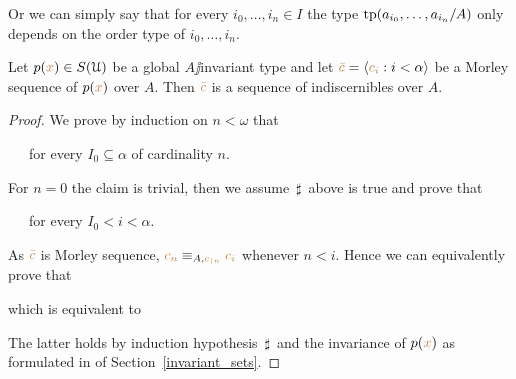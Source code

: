\documentclass[creche.tex]{subfiles}
\begin{document}

Or we can simply say that for every $i_0,\dots,i_n\in I$ the type ${\rm tp}(a_{i_0},\dots,a_{i_n}/A)$ only depends on the order type of $i_0,\dots,i_n$.

\begin{proposition}
Let $p({\color{brown} x})\in S(\EuScript U)$ be a global $A\jj$invariant type and let ${\color{brown}\bar c}=\langle{\color{brown}c_i}:i<\alpha\rangle$ be a Morley sequence of $p({\color{brown} x})$ over $A$.
Then ${\color{brown}\bar c}$ is a sequence of indiscernibles over $A$.
\end{proposition}

\begin{proof}


We prove by induction on $n<\omega$ that

\ \ \ for every $I_0\subseteq\alpha$ of cardinality $n$.

For $n=0$ the claim is trivial, then we assume $\,\sharp\,$ above is true and prove that

\ \ \ for every $I_0<i<\alpha$.

As ${\color{brown}\bar c}$ is  Morley sequence, ${\color{brown} c_n}\equiv_{A,{\color{brown} c_{\restriction n}}} {\color{brown} c_i}$ whenever $n<i$.
Hence we can equivalently prove that


which is equivalent to


The latter holds by induction hypothesis $\,\sharp\,$ and the invariance of $p({\color{brown} x})$ as formulated in  of Section~\ref{invariant_sets}.
\end{proof}

\end{document}
